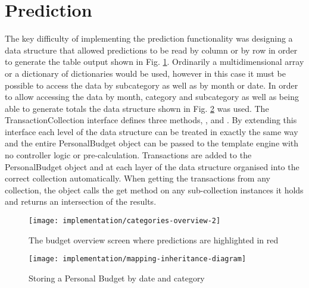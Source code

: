 \section{Prediction}
The key difficulty of implementing the prediction functionality was designing a data structure that allowed predictions to be read by column or by row in order to generate the table output shown in Fig. \ref{fig:imp-categories-overview}. Ordinarily a multidimensional array or a dictionary of dictionaries would be used, however in this case it must be possible to access the data by subcategory as well as by month or date.
%
In order to allow accessing the data by month, category and subcategory as well as being able to generate totals the data structure shown in Fig. \ref{fig:prediction-inheritance-diagram} was used. The TransactionCollection interface defines three methods, ,  and . By extending this interface each level of the data structure can be treated in exactly the same way and the entire PersonalBudget object can be passed to the template engine with no controller logic or pre-calculation. Transactions are added to the PersonalBudget object and at each layer of the data structure organised into the correct collection automatically. When getting the transactions from any collection, the object calls the get  method on any sub-collection instances it holds and returns an intersection of the results.

\begin{figure}[h]
    \centering
    \texttt{[image: implementation/categories-overview-2]}
    \caption{The budget overview screen where predictions are highlighted in red}
    \label{fig:imp-categories-overview}
\end{figure}

\begin{figure}[h]
    \centering
    \texttt{[image: implementation/mapping-inheritance-diagram]}
    \caption{Storing a Personal Budget by date and category}
    \label{fig:prediction-inheritance-diagram}
    
    \begin{comment}
[PersonalBudget]<>1-2>[Budget]
[<<Abstract>> CategoryCollection]^-[Budget]
[<<Interface>>;TransactionCollection]^-[Budget]
[<<Abstract>>;CategoryCollection]^-[TransactionDateCollection]
[<<Interface>>;TransactionCollection]^-[TransactionDateCollection]
[Budget]<>1-0..*>[TransactionDateCollection]
[<<Abstract>>;CategoryCollection]^-[TransactionCategoryCollection]
[<<Interface>>;TransactionCollection]^-[TransactionCategoryCollection]
[TransactionDateCollection]<>1-0..*>[TransactionCategoryCollection]
[<<Abstract>>;CategoryCollection]^-[TransactionSubCategoryCollection]
[<<Interface>>;TransactionCollection]^-[TransactionSubCategoryCollection]
[TransactionCategoryCollection]<>1-0..*>[TransactionSubCategoryCollection]
[TransactionSubCategoryCollection]<>1-0..*>[Transaction]
    \end{comment}
\end{figure}

